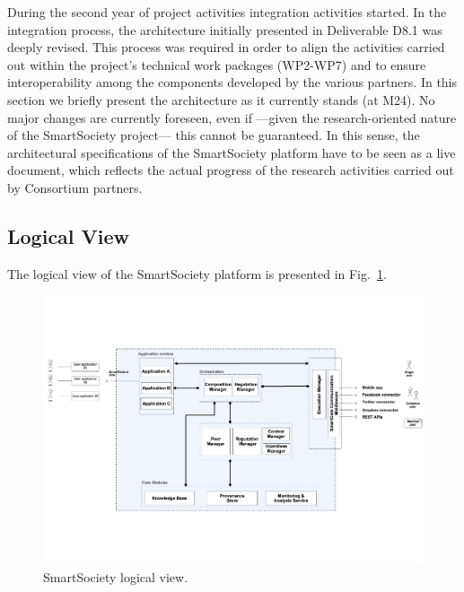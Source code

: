 During the second year of project activities integration activities
started. In the integration process, the architecture initially
presented in Deliverable D8.1 was deeply revised. This process was
required in order to align the activities carried out within the
project's technical work packages (WP2-WP7) and to ensure
interoperability among the components developed by the various
partners. In this section we briefly present the architecture as it
currently stands (at M24). No major changes are currently foreseen,
even if ---given the research-oriented nature of the SmartSociety
project--- this cannot be guaranteed. In this sense, the architectural
specifications of the SmartSociety platform have to be seen as a live document, which reflects the
actual progress of the research activities carried out by Consortium
partners. 

\subsection{Logical View}
The logical view of the SmartSociety platform is presented in Fig.~\ref{fig:logical_view}. %

\begin{figure}
 \centering
 \includegraphics[width=1\textwidth]{figs/logical_view.pdf}
 \caption{SmartSociety logical view.}
 \label{fig:logical_view}
\end{figure}

